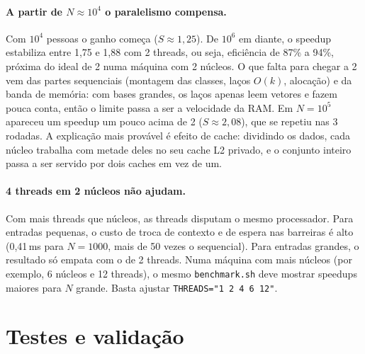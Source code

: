 \documentclass[11pt,a4paper]{article}
\begin{document}
\paragraph{A partir de $N \approx 10^4$ o paralelismo compensa.} Com $10^4$ pessoas o ganho começa
($S \approx 1{,}25$). De $10^6$ em diante, o speedup estabiliza entre 1,75 e 1,88 com 2 threads, ou seja,
eficiência de 87\% a 94\%, próxima do ideal de 2 numa máquina com 2 núcleos. O que falta para chegar a 2 vem das
partes sequenciais (montagem das classes, laços $O(k)$, alocação) e da banda de memória: com bases grandes, os
laços apenas leem vetores e fazem pouca conta, então o limite passa a ser a velocidade da RAM. Em $N = 10^5$
apareceu um speedup um pouco acima de 2 ($S \approx 2{,}08$), que se repetiu nas 3 rodadas. A explicação mais
provável é efeito de cache: dividindo os dados, cada núcleo trabalha com metade deles no seu cache L2 privado,
e o conjunto inteiro passa a ser servido por dois caches em vez de um.

\paragraph{4 threads em 2 núcleos não ajudam.} Com mais threads que núcleos, as threads disputam o mesmo
processador. Para entradas pequenas, o custo de troca de contexto e de espera nas barreiras é alto
(0,41\,ms para $N=1000$, mais de 50 vezes o sequencial). Para entradas grandes, o resultado só empata com o
de 2 threads. Numa máquina com mais núcleos (por exemplo, 6 núcleos e 12 threads), o mesmo
\texttt{benchmark.sh} deve mostrar speedups maiores para $N$ grande. Basta ajustar \texttt{THREADS="1 2 4 6 12"}.

\section{Testes e validação}
\end{document}
